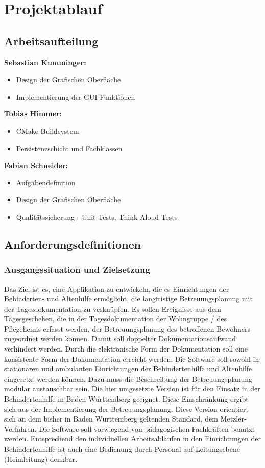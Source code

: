 \section{Projektablauf}

\subsection{Arbeitsaufteilung}
\textbf{Sebastian Kumminger:}
\begin{itemize}
	\item Design der Grafischen Oberfläche
	\item Implementierung der GUI-Funktionen
\end{itemize}
\textbf{Tobias Himmer:}
\begin{itemize}
	\item CMake Buildsystem
	\item Persistenzschicht und Fachklassen
\end{itemize}
\textbf{Fabian Schneider:}
\begin{itemize}
	\item Aufgabendefinition
	\item Design der Grafischen Oberfläche
	\item Qualitätssicherung - Unit-Tests, Think-Aloud-Tests
\end{itemize}

\subsection{Anforderungsdefinitionen}

\subsubsection{Ausgangssituation und Zielsetzung}
\label{subsubsec:ziel}
Das Ziel ist es, eine Applikation zu entwickeln, die es Einrichtungen der Behinderten- und Altenhilfe ermöglicht,
die langfristige Betreuungsplanung mit der Tagesdokumentation zu verknüpfen. Es sollen Ereignisse aus dem Tagesgeschehen,
die in der Tagesdokumentation der Wohngruppe / des Pflegeheims erfasst werden,
der Betreuungsplanung des betroffenen Bewohners zugeordnet werden können.
Damit soll doppelter Dokumentationsaufwand verhindert werden. Durch die elektronische Form der Dokumentation soll eine konsistente Form der Dokumentation erreicht werden. 
Die Software soll sowohl in stationären und ambulanten Einrichtungen der Behindertenhilfe und Altenhilfe eingesetzt werden können. Dazu muss die Beschreibung der Betreuungsplanung modular austauschbar sein. Die hier umgesetzte Version ist für den Einsatz in der Behindertenhilfe in Baden Württemberg geeignet. 
Diese Einschränkung ergibt sich aus der Implementierung der Betreuungsplanung. Diese Version orientiert sich an dem bisher in Baden Württemberg
geltenden Standard, dem Metzler-Verfahren.
Die Software soll vorwiegend von pädagogischen Fachkräften benutzt werden. Entsprechend den individuellen Arbeitsabläufen in den 
Einrichtungen der Behindertenhilfe ist auch eine Bedienung durch Personal auf Leitungsebene (Heimleitung) denkbar\cite{Pflichtenheft}.

